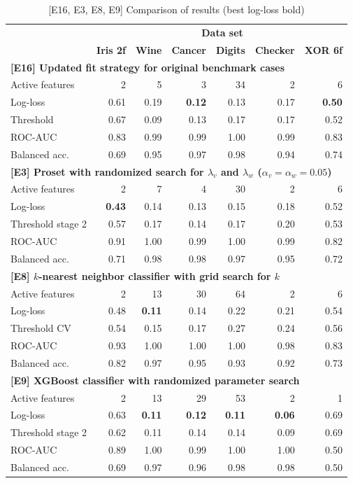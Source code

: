 \begin{table}
\caption{[E16, E3, E8, E9] Comparison of results (best log-loss bold)}
\label{tab_e16_e3_e8_e9}
%
\begin{center}
\small
\begin{tabular}{|lrrrrrr|}
\hline
&\multicolumn{6}{c|}{\textbf{\hrulefill\ Data set \hrulefill}}\\
&\textbf{Iris 2f}&\textbf{Wine}&\textbf{Cancer}&\textbf{Digits}&\textbf{Checker}&\textbf{XOR 6f}\\
\multicolumn{7}{|l|}{\textbf{[E16] Updated fit strategy for original benchmark cases}}\\
Active features&2&5&3&34&2&6\\
Log-loss&0.61&0.19&\textbf{0.12}&0.13&0.17&\textbf{0.50}\\
Threshold&0.67&0.09&0.13&0.17&0.17&0.52\\
ROC-AUC&0.83&0.99&0.99&1.00&0.99&0.83\\
Balanced acc.&0.69&0.95&0.97&0.98&0.94&0.74\\
\multicolumn{7}{|l|}{\textbf{[E3] Proset with randomized search for $\lambda_v$ and $\lambda_w$ ($\alpha_v=\alpha_w=0.05$)}}\\
Active features&2&7&4&30&2&6\\
Log-loss&\textbf{0.43}&0.14&0.13&0.15&0.18&0.52\\
Threshold stage 2&0.57&0.17&0.14&0.17&0.20&0.53\\
ROC-AUC&0.91&1.00&0.99&1.00&0.99&0.82\\
Balanced acc.&0.71&0.98&0.98&0.97&0.95&0.72\\
\multicolumn{7}{|l|}{\textbf{[E8] $k$-nearest neighbor classifier with grid search for $k$}}\\
Active features&2&13&30&64&2&6\\
Log-loss&0.48&\textbf{0.11}&0.14&0.22&0.21&0.54\\
Threshold CV&0.54&0.15&0.17&0.27&0.24&0.56\\
ROC-AUC&0.93&1.00&1.00&1.00&0.98&0.83\\
Balanced acc.&0.82&0.97&0.95&0.93&0.92&0.73\\
\multicolumn{7}{|l|}{\textbf{[E9] XGBoost classifier with randomized parameter search}}\\
Active features&2&13&29&53&2&1\\
Log-loss&0.63&\textbf{0.11}&\textbf{0.12}&\textbf{0.11}&\textbf{0.06}&0.69\\
Threshold stage 2&0.62&0.11&0.14&0.14&0.09&0.69\\
ROC-AUC&0.89&1.00&0.99&1.00&1.00&0.50\\
Balanced acc.&0.69&0.97&0.96&0.98&0.98&0.50\\
\hline
\end{tabular}
\end{center}
\end{table}
